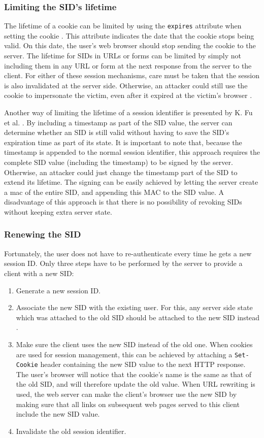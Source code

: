 \subsubsection{Limiting the SID's lifetime}\label{limiting-lifetime}
The lifetime of a cookie can be limited by using the \texttt{expires} attribute when setting the cookie \cite{Kristol2001}. This attribute indicates the date that the cookie stops being valid. On this date, the user's web browser should stop sending the cookie to the server. The lifetime for SIDs in URLs or forms can be limited by simply not including them in any URL or form at the next response from the server to the client. For either of these session mechanisms, care must be taken that the session is also invalidated at the server side. Otherwise, an attacker could still use the cookie to impersonate the victim, even after it expired at the victim's browser \cite{Kolsek2002}.

Another way of limiting the lifetime of a session identifier is presented by K. Fu et al. \cite{Fu2001}. By including a timestamp as part of the SID value, the server can determine whether an SID is still valid without having to save the SID's expiration time as part of its state. It is important to note that, because the timestamp is appended to the normal session identifier, this approach requires the complete SID value (including the timestamp) to be signed by the server. Otherwise, an attacker could just change the timestamp part of the SID to extend its lifetime. The signing can be easily achieved by letting the server create a \gls{mac} of the entire SID, and appending this MAC to the SID value. A disadvantage of this approach is that there is no possibility of revoking SIDs without keeping extra server state.

\subsubsection{Renewing the SID}\label{renewing-sid}
Fortunately, the user does not have to re-authenticate every time he gets a new session ID. Only three steps have to be performed by the server to provide a client with a new SID:
\begin{enumerate}
	\item Generate a new session ID.
	\item Associate the new SID with the existing user. For this, any server side state which was attached to the old SID should be attached to the new SID instead \cite{Wasser2007}.
	\item Make sure the client uses the new SID instead of the old one. When cookies are used for session management, this can be achieved by attaching a \texttt{Set-Cookie} header containing the new SID value to the next HTTP response. The user's browser will notice that the cookie's name is the same as that of the old SID, and will therefore update the old value. When URL rewriting is used, the web server can make the client's browser use the new SID by making sure that all links on subsequent web pages served to this client include the new SID value.
	\item Invalidate the old session identifier.
\end{enumerate}

